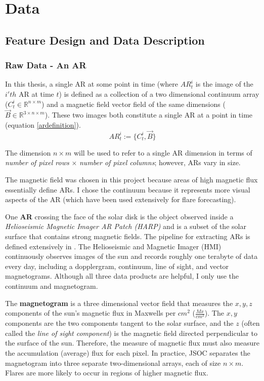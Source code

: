 \chapter{Data}
\label{chp:data}

\section{Feature Design and Data Description}
\subsection{Raw Data - An AR}
\label{activeregion}
In this thesis, a single AR at some point in time (where $AR^i_t$ is the image of the $i'th$ AR at time $t$) is defined as a collection of a two dimensional continuum array ($C^i_t \in \mathbb{R}^{n\times m}$) and a magnetic field vector field of the same dimensions ($\vec{B} \in \mathbb{R}^{3 \times n\times m}$). These two images both constitute a single AR at a point in time (equation \ref{ardefinition}).
\begin{equation}
AR_t^i := \{C^i_t, \vec{B}\}
\label{ardefinition}
\end{equation}

The dimension $n\times m$ will be used to refer to a single AR dimension in terms of \textit{number of pixel rows} $\times$ \textit{number of pixel columns}; however, ARs vary in size.

The magnetic field was chosen in this project because areas of high magnetic flux essentially define ARs. I chose the continuum because it represents more visual aspects of the AR (which have been used extensively for flare forecasting).

One \textbf{AR} crossing the face of the solar disk is the object observed inside a \textit{Helioseismic Magnetic Imager AR Patch (HARP)} \cite{HARP} and is a subset of the solar surface that contains strong magnetic fields. The pipeline for extracting ARs is defined extensively in \cite{SHARP_Pipeline}. The Helioseismic and Magnetic Imager (HMI) continuously observes images of the sun and records roughly one terabyte of data every day, including a dopplergram, continuum, line of sight, and vector magnetograms. Although all three data products are helpful, I only use the continuum and magnetogram.

The \textbf{magnetogram} is a three dimensional vector field that measures the $x, y, z$ components of the sun's magnetic flux in Maxwells per $cm^2$ ($\frac{Mx}{cm^2}$). The $x, y$ components are the two components tangent to the solar surface, and the $z$ (often called the \textit{line of sight component}) is the magnetic field directed perpendicular to the surface of the sun. Therefore, the measure of magnetic flux must also measure the accumulation (average) flux for each pixel. In practice, JSOC separates the magnetogram into three separate two-dimensional arrays, each of size $n \times m$. Flares are more likely to occur in regions of higher magnetic flux.

